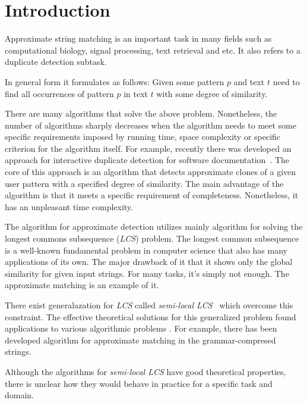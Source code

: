 \section{Introduction}
Approximate string matching is an important task in many fields such as computational biology, signal processing, text retrieval and etc.
It also refers to a duplicate detection subtask.

In general form it formulates as follows: Given some pattern $p$ and text $t$ need to find all occurrences of pattern $p$ in text $t$ with some degree of similarity.

There are many algorithms that solve the above problem.
Nonetheless, the number of algorithms sharply decreases  when the algorithm needs to meet some specific requirements imposed by running time, space complexity or specific criterion for the algorithm itself.
For example, recently there was developed an approach for interactive duplicate detection for software documentation~\cite{luciv2019interactive}.
The core of this approach is an algorithm that detects approximate clones of a given user pattern with a specified degree of similarity. 
The main advantage of the algorithm is that it meets a specific requirement of completeness.
Nonetheless, it has an unpleasant time complexity.    


The algorithm for approximate detection utilizes mainly algorithm for solving the longest commons subsequence (\emph{LCS}) problem.
The longest common subsequence is a well-known fundamental problem in computer science that also has many applications of its own.
The major drawback of it that it shows only the global similarity for given input strings.
For many tasks, it's simply not enough.
The approximate matching is an example of it.

There exist generalazation for \emph{LCS} called \emph{semi-local LCS}~\cite{} which overcome this constraint. 
The effective theoretical solutions for this generalized problem found applications to various algorithmic problems .
For example, there has been developed algorithm for approximate matching in the grammar-compresed strings\cite{}.

Although the algorithms for \emph{semi-local LCS} have good theoretical properties, there is unclear how they would behave in practice for a specific task and domain.

